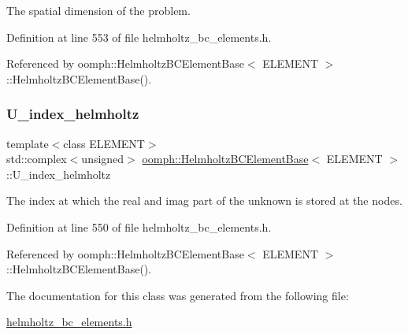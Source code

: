 The spatial dimension of the problem. 



Definition at line 553 of file helmholtz\+\_\+bc\+\_\+elements.\+h.



Referenced by oomph\+::\+Helmholtz\+B\+C\+Element\+Base$<$ E\+L\+E\+M\+E\+N\+T $>$\+::\+Helmholtz\+B\+C\+Element\+Base().

\mbox{\label{classoomph_1_1HelmholtzBCElementBase_ad3e6d12158c24f428c295bd5ad54365e}} 
\subsubsection{\texorpdfstring{U\+\_\+index\+\_\+helmholtz}{U\_index\_helmholtz}}
{\footnotesize\ttfamily template$<$class E\+L\+E\+M\+E\+NT$>$ \\
std\+::complex$<$unsigned$>$ \hyperlink{classoomph_1_1HelmholtzBCElementBase}{oomph\+::\+Helmholtz\+B\+C\+Element\+Base}$<$ E\+L\+E\+M\+E\+NT $>$\+::U\+\_\+index\+\_\+helmholtz\hspace{0.3cm}{\ttfamily [protected]}}



The index at which the real and imag part of the unknown is stored at the nodes. 



Definition at line 550 of file helmholtz\+\_\+bc\+\_\+elements.\+h.



Referenced by oomph\+::\+Helmholtz\+B\+C\+Element\+Base$<$ E\+L\+E\+M\+E\+N\+T $>$\+::\+Helmholtz\+B\+C\+Element\+Base().



The documentation for this class was generated from the following file\+:\begin{DoxyCompactItemize}
\item 
\hyperlink{helmholtz__bc__elements_8h}{helmholtz\+\_\+bc\+\_\+elements.\+h}\end{DoxyCompactItemize}
